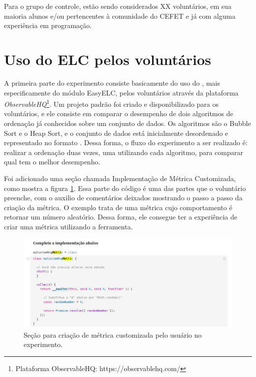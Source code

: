 \documentclass[12pt]{tcc}
\begin{document}
Para o grupo de controle, estão sendo considerados XX voluntários, em sua maioria alunos e/ou pertencentes à comunidade do CEFET e já com alguma experiência em programação. 

\section{Uso do ELC pelos voluntários}
\label{section:parte-1-experimento}

A primeira parte do experimento consiste basicamente do uso do , mais especificamente do módulo EasyELC, pelos voluntários através da plataforma \emph{ObservableHQ}\footnote{Plataforma ObservableHQ: https://observablehq.com/}. Um projeto padrão foi criado e disponibilizado para os voluntários, e ele consiste em comparar o desempenho de dois algoritmos de ordenação já conhecidos sobre um conjunto de dados. Os algoritmos são o Bubble Sort e o Heap Sort, e o conjunto de dados está inicialmente desordenado e representado no formato . Dessa forma, o fluxo do experimento a ser realizado é: realizar a ordenação duas vezes, uma utilizando cada algoritmo, para comparar qual tem o melhor desempenho.

Foi adicionado uma seção chamada Implementação de Métrica Customizada, como mostra a figura \ref{fig:metrica-observable}. Essa parte do código é uma das partes que o voluntário preenche, com o auxilio de comentários deixados mostrando o passo a passo da criação da métrica. O exemplo trata de uma métrica cujo comportamento é retornar um número aleatório. Dessa forma, ele consegue ter a experiência de criar uma métrica utilizando a ferramenta.

\begin{figure}[!ht]
	\centering
	\includegraphics[width=1\textwidth]{figures/experimento-metrica.jpeg}
	\caption{Seção para criação de métrica customizada pelo usuário no experimento.}
	\label{fig:metrica-observable}
\end{figure}
\end{document}
